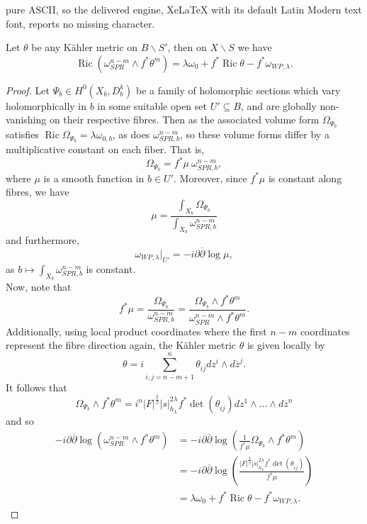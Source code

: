 \documentclass[10pt,a4paper]{amsart}
\DeclareMathOperator{\Ric}{Ric}
\newcommand{\dbar}{\overline{\partial}}
\newcommand{\oo}[1]{\overline{#1}}
\renewcommand{\d}{\partial}
\begin{document}
pure ASCII, so the delivered engine, XeLaTeX with its default Latin Modern text font, reports no missing character.
\begin{proposition}\label{ric_of_fibration_volume_form}
Let $\theta$ be any K\"ahler metric on $B\backslash S'$, then on $X \backslash S$ we have
\begin{equation}
    \Ric (\omega_{SPR}^{n-m} \wedge f^* \theta^m) = \lambda \omega_0  +f^* \Ric \theta - f^* \omega_{WP,\lambda}.
\end{equation}
\end{proposition}

\begin{proof}
Let $\Psi_b \in H^0(X_b,D_b^k)$ be a family of holomorphic sections which vary holomorphically in $b$ in some suitable open set $U' \subseteq B$, and are globally non-vanishing on their respective fibres. Then as the associated volume form $\Omega_{\Psi_b}$ satisfies $\Ric \Omega_{\Psi_b} = \lambda \omega_{0,b}$, as does $\omega_{SPR,b}^{n-m}$, so these volume forms differ by a multiplicative constant on each fiber. That is, 
\begin{equation*}
    \Omega_{\Psi_b} = f^*\mu \ \omega_{SPR,b}^{n-m},
\end{equation*}
where $\mu$ is a smooth function in $b \in U'$. Moreover, since $f^*\mu$ is constant along fibres, we have 
\begin{equation*}
    \mu= \frac{\int_{X_b} \Omega_{\Psi_b}}{\int_{X_b}\omega_{SPR,b}^{n-m}}
\end{equation*}
and furthermore,
\begin{equation*}
    \omega_{WP,\lambda}|_{U'} = -i\d\dbar \log \mu,
\end{equation*}
as $b \mapsto \int_{X_b} \omega_{SPR,b}^{n-m}$ is constant.\\ 
Now, note that
\begin{equation*}
    f^*\mu = \frac{\Omega_{\Psi_b}}{\omega_{SPR,b}^{n-m}} = \frac{\Omega_{\Psi_b} \wedge f^* \theta^m}{\omega_{SPR}^{n-m} \wedge f^* \theta^m}.
\end{equation*}
Additionally, using local product coordinates where the first $n-m$ coordinates represent the fibre direction again, the K\"ahler metric $\theta$ is given locally by
\begin{equation*}
    \theta = i\sum_{i,j=n-m+1}^n \theta_{i\oo{j}} dz^i \wedge d\oo{z}^j.
\end{equation*}
It follows that
\begin{equation*}
    \Omega_{\Psi_b} \wedge f^* \theta^m = i^n |F|^{\frac{2}{\beta}} |s|^{2\lambda}_{h_{L}} f^*\det(\theta_{i\oo{j}}) dz^1 \wedge \dots \wedge d\oo{z}^n
\end{equation*}
and so
\begin{align*}
    -i\d\dbar\log (\omega_{SPR}^{n-m} \wedge f^* \theta^m) &= -i\d\dbar \log \left(\frac{1}{f^*\mu} \Omega_{\Psi_b} \wedge f^* \theta^m\right)\\
    &= -i\d\dbar\log\left(\frac{|F|^{\frac{2}{\beta}} |s|^{2\lambda}_{h_{L}} f^*\det(\theta_{i\oo{j}})}{f^*\mu}\right)\\
    &=  \lambda \omega_0 + f^* \Ric \theta - f^*\omega_{WP,\lambda}.
\end{align*}
\end{proof}
\end{document}
